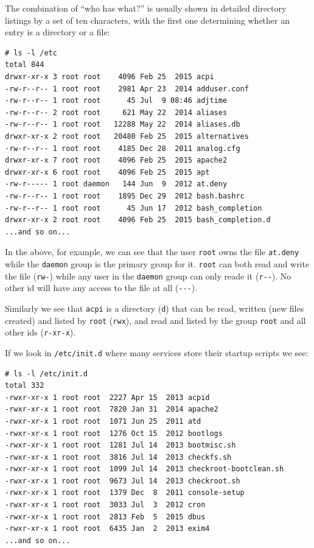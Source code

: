 \documentclass[10pt,]{book}
\numberwithin{figure}{chapter}
\begin{document}
The combination of ``who has what?'' is usually shown in detailed
directory listings by a set of ten characters, with the first one
determining whether an entry is a directory or a file:

\begin{verbatim}
# ls -l /etc
total 844
drwxr-xr-x 3 root root    4096 Feb 25  2015 acpi
-rw-r--r-- 1 root root    2981 Apr 23  2014 adduser.conf
-rw-r--r-- 1 root root      45 Jul  9 08:46 adjtime
-rw-r--r-- 2 root root     621 May 22  2014 aliases
-rw-r--r-- 1 root root   12288 May 22  2014 aliases.db
drwxr-xr-x 2 root root   20480 Feb 25  2015 alternatives
-rw-r--r-- 1 root root    4185 Dec 28  2011 analog.cfg
drwxr-xr-x 7 root root    4096 Feb 25  2015 apache2
drwxr-xr-x 6 root root    4096 Feb 25  2015 apt
-rw-r----- 1 root daemon   144 Jun  9  2012 at.deny
-rw-r--r-- 1 root root    1895 Dec 29  2012 bash.bashrc
-rw-r--r-- 1 root root      45 Jun 17  2012 bash_completion
drwxr-xr-x 2 root root    4096 Feb 25  2015 bash_completion.d
...and so on...
\end{verbatim}

In the above, for example, we can see that the user \texttt{root} owns
the file \texttt{at.deny} while the \texttt{daemon} group is the primary
group for it. \texttt{root} can both read and write the file
(\texttt{rw-}) while any user in the \texttt{daemon} group can only
reade it (\texttt{r-{}-}). No other id will have any access to the file
at all (\texttt{-{}-{}-}).

Similarly we see that \texttt{acpi} is a directory (\texttt{d}) that can
be read, written (new files created) and listed by \texttt{root}
(\texttt{rwx}), and read and listed by the group \texttt{root} and all
other ids (\texttt{r-xr-x}).

If we look in \texttt{/etc/init.d} where many services store their
startup scripts we see:

\begin{verbatim}
# ls -l /etc/init.d
total 332
-rwxr-xr-x 1 root root  2227 Apr 15  2013 acpid
-rwxr-xr-x 1 root root  7820 Jan 31  2014 apache2
-rwxr-xr-x 1 root root  1071 Jun 25  2011 atd
-rwxr-xr-x 1 root root  1276 Oct 15  2012 bootlogs
-rwxr-xr-x 1 root root  1281 Jul 14  2013 bootmisc.sh
-rwxr-xr-x 1 root root  3816 Jul 14  2013 checkfs.sh
-rwxr-xr-x 1 root root  1099 Jul 14  2013 checkroot-bootclean.sh
-rwxr-xr-x 1 root root  9673 Jul 14  2013 checkroot.sh
-rwxr-xr-x 1 root root  1379 Dec  8  2011 console-setup
-rwxr-xr-x 1 root root  3033 Jul  3  2012 cron
-rwxr-xr-x 1 root root  2813 Feb  5  2015 dbus
-rwxr-xr-x 1 root root  6435 Jan  2  2013 exim4
...and so on...
\end{verbatim}
\end{document}

